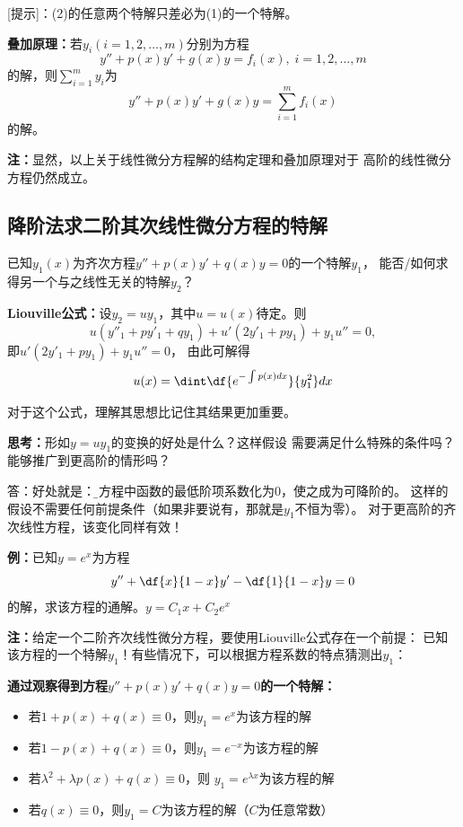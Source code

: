 [提示]：(2)的任意两个特解只差必为(1)的一个特解。

\begin{thx}
	{\bf 叠加原理：}若$y_i(i=1,2,\ldots,m)$分别为方程
	$$y''+p(x)y'+g(x)y=f_i(x),\;i=1,2,\ldots,m$$
	的解，则$\sum\limits_{i=1}^my_i$为
	$$y''+p(x)y'+g(x)y=\sum\limits_{i=1}^mf_i(x)$$
	的解。
\end{thx}

{\bf 注：}显然，以上关于线性微分方程解的结构定理和叠加原理对于
高阶的线性微分方程仍然成立。


\subsection{降阶法求二阶其次线性微分方程的特解}

已知$y_1(x)$为齐次方程$y''+p(x)y'+q(x)y=0$的一个特解$y_1$，
能否/如何求得另一个与之线性无关的特解$y_2$？

\begin{thx}
	{\bf Liouville公式：}设$y_2=uy_1$，其中$u=u(x)$待定。则
	$$u{(y''_1+py'_1+qy_1)}+u'(2y'_1+py_1)+y_1u''=0,$$ 
	即$u'(2y'_1+py_1)+y_1u''=0$， 由此可解得
	$${u(x)=\dint\df{e^{-\int p(x)dx}}{y_1^2}dx}$$	
\end{thx}

对于这个公式，理解其思想比记住其结果更加重要。

{\bf 思考：}形如$y=uy_1$的变换的好处是什么？这样假设
需要满足什么特殊的条件吗？能够推广到更高阶的情形吗？

答：好处就是：{\b 将方程中函数的最低阶项系数化为$0$，使之成为可降阶的}。
这样的假设不需要任何前提条件（如果非要说有，那就是$y_1$不恒为零）。
对于更高阶的齐次线性方程，该变化同样有效！

{\bf 例：}已知$y=e^x$为方程
$$y''+\df{x}{1-x}y'-\df{1}{1-x}y=0$$
的解，求该方程的通解。\hfill $y=C_1x+C_2e^x$

{\bf 注：}给定一个二阶齐次线性微分方程，要使用Liouville公式存在一个前提：
已知该方程的一个特解$y_1$！有些情况下，可以根据方程系数的特点猜测出$y_1$：

\begin{thx}
	{\bf 通过观察得到方程$y''+p(x)y'+q(x)y=0$的一个特解：}
	
	\begin{itemize}
	  \item 若$1+p(x)+q(x)\equiv0$，则$y_1=e^x$为该方程的解
	  \item 若$1-p(x)+q(x)\equiv0$，则$y_1=e^{-x}$为该方程的解
	  \item 若$\lambda^2+\lambda p(x)+q(x)\equiv0$，则
	  $y_1=e^{\lambda x}$为该方程的解
	  \item 若$q(x)\equiv0$，则$y_1=C$为该方程的解（$C$为任意常数）
	\end{itemize}
\end{thx}

